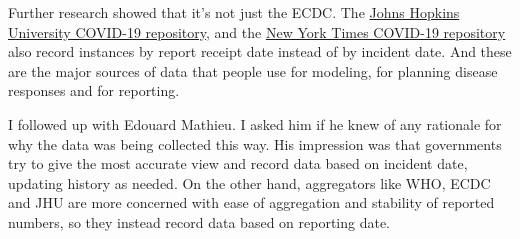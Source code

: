 \documentclass[10pt,reqno]{amsart}
\begin{document}
Further research showed that it's not just the ECDC.  The
\href{https://github.com/CSSEGISandData/COVID-19}{Johns Hopkins
  University COVID-19 repository}, and the
\href{https://github.com/nytimes/covid-19-data}{New York Times
  COVID-19 repository} also record instances by report receipt date
instead of by incident date.  And these are the major sources of data
that people use for modeling, for planning disease responses and for
reporting.

I followed up with Edouard Mathieu.  I asked him if he knew of any
rationale for why the data was being collected this way.  His
impression was that governments try to give the most accurate view and
record data based on incident date, updating history as needed.  On
the other hand, aggregators like WHO, ECDC and JHU are more concerned
with ease of aggregation and stability of reported numbers, so they
instead record data based on reporting date.\cite{Mathieu2020Dates}





\end{document}
